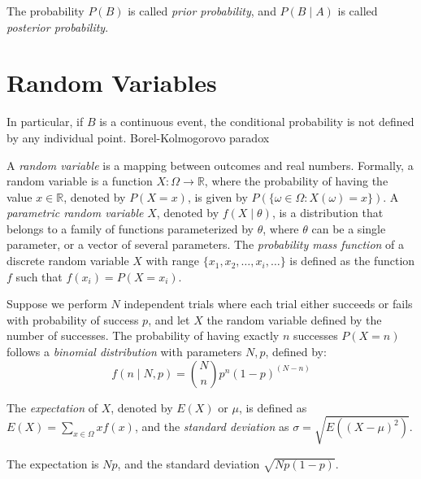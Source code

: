The probability $P\left( B \right)$ is called \emph{prior probability}, and $P\left( B\mid A \right)$ is called \emph{posterior probability}.

%
%

\section{Random Variables}
\label{sec:probability_random_variables}

{\color{red} In particular, if $B$ is a continuous event, the conditional probability is not defined by any individual point. Borel-Kolmogorovo paradox}


A \emph{random variable} is a mapping between outcomes and real numbers. Formally, a random variable is a function $X : \Omega \rightarrow \mathbb{R}$, where the probability of having the value $x \in \mathbb{R}$, denoted by $P(X=x)$, is given by $P(\{ \omega \in \Omega : X(\omega) = x\})$. A \emph{parametric random variable} $X$, denoted by $f\left(X \mid \theta \right)$, is a distribution that belongs to a family of functions parameterized by $\theta$, where $\theta$ can be a single parameter, or a vector of several parameters. The \emph{probability mass function} of a discrete random variable $X$ with range $\{ x_1, x_2, \ldots, x_i, \ldots \}$ is defined as the function $f$ such that $f(x_i) = P(X=x_i)$.

\begin{example}
Suppose we perform $N$ independent trials where each trial either succeeds or fails with probability of success $p$, and let $X$ the random variable defined by the number of successes. The probability of having exactly $n$ successes $P(X=n)$ follows a \emph{binomial distribution} with parameters $N, p$, defined by:
\[
f(n\mid N, p) = \binom{N}{n} p^n (1-p)^{(N-n)}
\]
\end{example}

The \emph{expectation} of $X$, denoted by $E(X)$ or $\mu$, is defined as $E(X) = \sum_{x \in \Omega} x f(x)$, and the \emph{standard deviation} as $\sigma = \sqrt{E \left( (X - \mu)^2 \right)}$.

\begin{example}
The expectation is $Np$, and the standard deviation $\sqrt{Np(1-p)}$.
\end{example}

%
%

